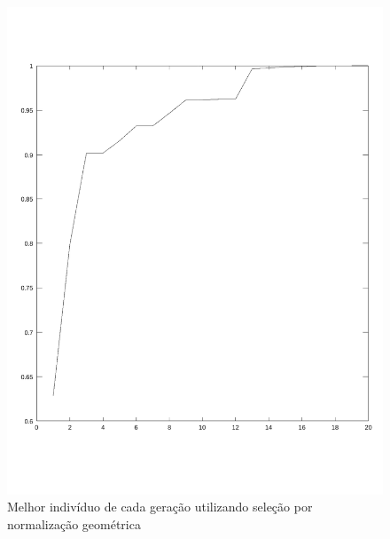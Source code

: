 \documentclass{article}
\begin{document}
\newpage
\begin{figure}[h!]
\centering
\includegraphics[scale=.6]{images/melhorIndividuoACadaGeracaoC.pdf}
\caption{Melhor indivíduo de cada geração utilizando seleção por normalização geométrica}
\label{fig:melhorIndividuoACadaGeracaoC}
\end{figure}
\end{document}
